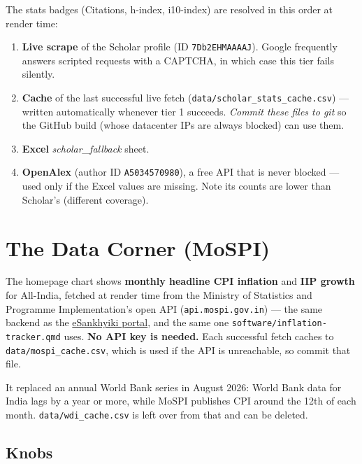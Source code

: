 \documentclass[11pt,a4paper]{article}
\newcommand{\file}[1]{\texttt{#1}}
\begin{document}
The stats badges (Citations, h-index, i10-index) are resolved in this
order at render time:

\begin{enumerate}[itemsep=1pt]
  \item \textbf{Live scrape} of the Scholar profile
        (ID \texttt{7Db2EHMAAAAJ}). Google frequently answers scripted
        requests with a CAPTCHA, in which case this tier fails silently.
  \item \textbf{Cache} of the last successful live fetch
        (\file{data/scholar\_stats\_cache.csv}) --- written automatically
        whenever tier 1 succeeds. \emph{Commit these files to git} so the
        GitHub build (whose datacenter IPs are always blocked) can use them.
  \item \textbf{Excel} \emph{scholar\_fallback} sheet.
  \item \textbf{OpenAlex} (author ID \texttt{A5034570980}), a free API that
        is never blocked --- used only if the Excel values are missing.
        Note its counts are lower than Scholar's (different coverage).
\end{enumerate}

\section{The Data Corner (MoSPI)}\label{sec:mospi}

The homepage chart shows \textbf{monthly headline CPI inflation} and
\textbf{IIP growth} for All-India, fetched at render time from the Ministry
of Statistics and Programme Implementation's open API
(\texttt{api.mospi.gov.in}) --- the same backend as the
\href{https://esankhyiki.mospi.gov.in}{eSankhyiki portal}, and the same one
\file{software/inflation-tracker.qmd} uses. \textbf{No API key is needed.}
Each successful fetch caches to \file{data/mospi\_cache.csv}, which is used
if the API is unreachable, so commit that file.

It replaced an annual World Bank series in August 2026: World Bank data for
India lags by a year or more, while MoSPI publishes CPI around the 12th of
each month. \file{data/wdi\_cache.csv} is left over from that and can be
deleted.

\subsection{Knobs}
\end{document}
